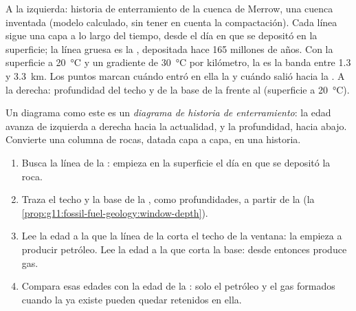\begin{omfigure}
{\small A la izquierda: historia de enterramiento de la cuenca de Merrow, una
cuenca inventada (modelo calculado, sin tener en cuenta la compactación). Cada
línea sigue una capa a lo largo del tiempo, desde el día en que se depositó en
la superficie; la línea gruesa es la , depositada hace 165
millones de años. Con la superficie a \qty{20}{\degreeCelsius} y un gradiente
de \qty{30}{\degreeCelsius} por kilómetro, la  es la banda
entre \num{1.3} y \qty{3.3}{km}. Los puntos marcan cuándo entró en ella la  y cuándo salió hacia la . A la derecha: profundidad
del techo y de la base de la  frente al  (superficie a \qty{20}{\degreeCelsius}).}
\end{omfigure}

Un diagrama como este es un \emph{diagrama de historia de enterramiento}: la
edad avanza de izquierda a derecha hacia la actualidad, y la profundidad, hacia
abajo. Convierte una columna de rocas, datada capa a capa, en una historia.

\begin{method}\label{met:g11:fossil-fuel-geology:burial}
\begin{enumerate}
  \item Busca la línea de la : empieza en la superficie el día
        en que se depositó la roca.
  \item Traza el techo y la base de la , como
        profundidades, a partir de la 
        (la \cref{prop:g11:fossil-fuel-geology:window-depth}).
  \item Lee la edad a la que la línea de la  corta el techo de
        la ventana: la  empieza a producir petróleo. Lee la
        edad a la que corta la base: desde entonces produce gas.
  \item Compara esas edades con la edad de la : solo el petróleo y el
        gas formados cuando la  ya existe pueden quedar retenidos en ella.
\end{enumerate}
\end{method}

